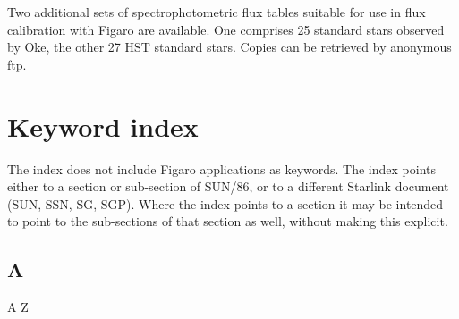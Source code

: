  Two additional sets of spectrophotometric flux tables suitable for use
 in flux calibration with Figaro are available.  One comprises 25 standard
 stars observed by Oke, the other 27 HST standard stars.  Copies can be
 retrieved by anonymous ftp.



\sloppy\twocolumn
\section{\label{keywords}Keyword index}

   The index does not include Figaro applications as keywords.
   The index points either to a section or sub-section of SUN/86, or to
   a different Starlink document (SUN, SSN, SG, SGP). Where the index
   points to a section it may be intended to point to the sub-sections
   of that section as well, without making this explicit.

\small

\subsection*{\label{index_A}A}

\begin{htmlonly}
A
Z
\end{htmlonly}


